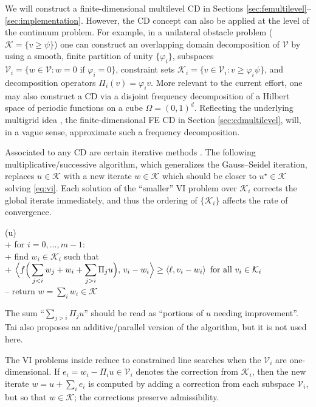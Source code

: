 \documentclass[review,hidelinks,onefignum,onetabnum,final]{siamart220329}  %
\newcommand{\cK}{\mathcal{K}}
\newcommand{\cV}{\mathcal{V}}
\newcommand{\ip}[2]{\left<#1,#2\right>}
\begin{document}
We will construct a finite-dimensional multilevel CD in Sections \ref{sec:femultilevel}--\ref{sec:implementation}.  However, the CD concept can also be applied at the level of the continuum problem.  For example, in a unilateral obstacle problem ($\cK = \{v \ge \psi\}$) one can construct an overlapping domain decomposition of $\cV$ by using a smooth, finite partition of unity $\{\varphi_i\}$, subspaces $\cV_i = \{w \in \cV : w = 0 \text{ if } \varphi_i = 0\}$, constraint sets $\cK_i = \{v \in \cV_i : v \ge \varphi_i \psi\}$, and decomposition operators $\Pi_i(v) = \varphi_i v$.  More relevant to the current effort, one may also construct a CD via a disjoint frequency decomposition of a Hilbert space of periodic functions on a cube $\Omega=(0,1)^d$.  Reflecting the underlying multigrid idea \cite{Trottenbergetal2001}, the finite-dimensional FE CD in Section \ref{sec:cdmultilevel}, will, in a vague sense, approximate such a frequency decomposition.

Associated to any CD are certain iterative methods \cite{Tai2003,Xu1992}.  The following multiplicative/successive  algorithm, which generalizes the Gauss--Seidel iteration, replaces $u \in \cK$ with a new iterate $w\in\cK$ which should be closer to $u^\star \in \cK$ solving \eqref{eq:vi}.  Each solution of the ``smaller'' VI problem over $\cK_i$ corrects the global iterate immediately, and thus the ordering of $\{\cK_i\}$ affects the rate of convergence.

\begin{pseudo*}
(u)\text{:} \\+
    for $i = 0,\dots,m-1$: \\+
        \rm{find} $w_i\in \cK_i$ \rm{such that} \\+
            $\displaystyle \Big<f\Big(\sum_{j<i} w_j + w_i + \sum_{j>i} \Pi_j u\Big),\, v_i - w_i\Big> \ge \ip{\ell}{v_i - w_i} \textnormal{ for all } v_i \in \cK_i$ \\--
    return $w=\sum_i w_i\in\cK$
\end{pseudo*}

\noindent The sum ``$\sum_{j>i} \Pi_j u$'' should be read as ``portions of $u$ needing improvement''.  Tai \cite{Tai2003} also proposes an additive/parallel version of the algorithm, but it is not used here.

The VI problems inside  reduce to constrained line searches when the $\cV_i$ are one-dimensional.  If $e_i = w_i - \Pi_i u \in \cV_i$ denotes the correction from $\cK_i$, then the new iterate $w = u + \sum_i e_i$ is computed by adding a correction from each subspace $\cV_i$, but so that $w \in \cK$; the corrections preserve admissibility.
\end{document}
